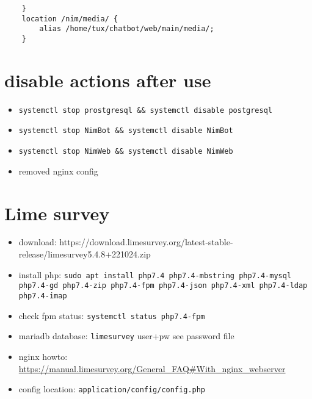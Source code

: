 \documentclass{article}
\begin{document}
\begin{verbatim}
    }                                                                                                                                                                                                                                                         
    location /nim/media/ {                                                                                                                                                                                                                                    
        alias /home/tux/chatbot/web/main/media/;                                                                                                                                                                                                              
    }    
\end{verbatim}

\section{disable actions after use}

\begin{itemize}
    \item \verb|systemctl stop prostgresql && systemctl disable postgresql|
    \item \verb|systemctl stop NimBot && systemctl disable NimBot|
    \item \verb|systemctl stop NimWeb && systemctl disable NimWeb|
    \item removed nginx config
\end{itemize}

\section{Lime survey}
\begin{itemize}
    \item download: https://download.limesurvey.org/latest-stable-release/limesurvey5.4.8+221024.zip
    \item install php: \verb|sudo apt install php7.4 php7.4-mbstring php7.4-mysql php7.4-gd php7.4-zip php7.4-fpm php7.4-json php7.4-xml php7.4-ldap php7.4-imap|
    \item check fpm status: \verb|systemctl status php7.4-fpm|
    \item mariadb database: \verb|limesurvey| user+pw see password file
    \item nginx howto: \url{https://manual.limesurvey.org/General_FAQ#With_nginx_webserver}
    \item config location: \verb|application/config/config.php|
\end{itemize}
\end{document}
